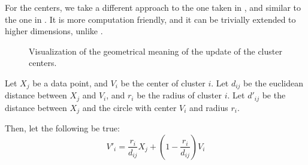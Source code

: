 \documentclass[conference]{IEEEtran}
\begin{document}
For the centers, we take a different approach to the one taken in \cite{308484}, and similar to the one in \cite{DAVE1992713}. It is more computation friendly, and it can be
trivially extended to higher dimensions, unlike \cite{308484}.

\begin{figure}
\begin{center}
\end{center}
\caption{Visualization of the geometrical meaning of the update of the cluster centers.}
\end{figure}


Let $X_j$ be a data point, and $V_i$ be the center of cluster $i$. Let $d_{ij}$ be the euclidean distance between $X_j$ and $V_i$,
and $r_i$ be the radius of cluster $i$.
Let $d'_{ij}$ be the distance between $X_j$ and the circle with center $V_i$ and radius $r_i$.

Then, let the following be true:
\begin{equation}
V'_i = \frac{r_i}{d_{ij}}X_j + (1 - \frac{r_i}{d_{ij}})V_i
\end{equation}
\end{document}
